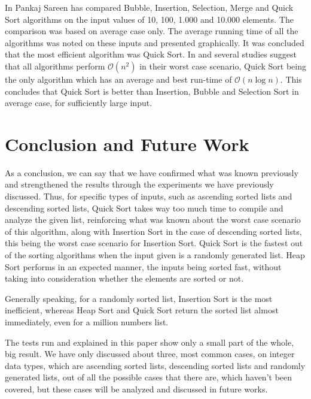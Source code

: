 \documentclass[]{article}
\begin{document}
In \cite{sareen2013comparison} Pankaj Sareen has compared Bubble, Insertion, Selection, Merge and Quick Sort algorithms on the input values of 10, 100, 1.000 and 10.000 elements. The comparison was based on average case only. The average running time of all the algorithms was noted on these inputs and presented graphically. It was concluded that the most efficient algorithm was Quick Sort. In \cite{Cormen:2009:IAT} and \cite{ocampo2008empirical} several studies suggest that all algorithms perform $\mathcal{O}(n^2)$ in their worst case scenario, Quick Sort being the only algorithm which has an average and best run-time of $\mathcal{O}(n\log{}n)$. This concludes that Quick Sort is better than Insertion, Bubble and Selection Sort in average case, for sufficiently large input. 

	\pagebreak
		
	\section{Conclusion and Future Work}
As a conclusion, we can say that we have confirmed what was known previously and strengthened the results through the experiments we have previously discussed. Thus, for specific types of inputs, such as ascending sorted lists and descending sorted lists, Quick Sort takes way too much time to compile and analyze the given list, reinforcing what was known about the worst case scenario of this algorithm, along with Insertion Sort in the case of descending sorted lists, this being the worst case scenario for Insertion Sort. Quick Sort is the fastest out of the sorting algorithms when the input given is a randomly generated list. Heap Sort performs in an expected manner, the inputs being sorted fast, without taking into consideration whether the elements are sorted or not.

Generally speaking, for a randomly sorted list, Insertion Sort is the most inefficient, whereas Heap Sort and Quick Sort return the sorted list almost immediately, even for a million numbers list.

The tests run and explained in this paper show only a small part of the whole, big result. We have only discussed about three, most common cases, on integer data types, which are ascending sorted lists, descending sorted lists and randomly generated lists, out of all the possible cases that there are, which haven't been covered, but these cases will be analyzed and discussed in future works.

	\pagebreak	
	
\printbibliography

\end{document}
